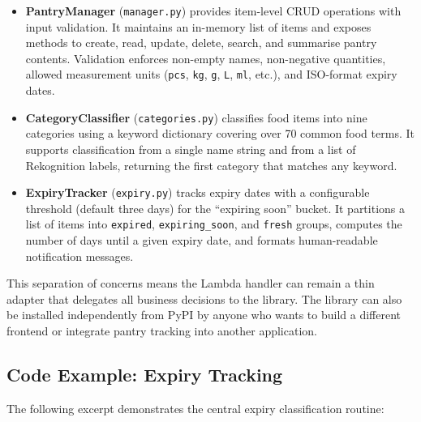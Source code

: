 \documentclass[conference]{IEEEtran}
\begin{document}
\begin{itemize}
    \item \textbf{PantryManager} (\texttt{manager.py}) provides item-level CRUD operations with input validation. It maintains an in-memory list of items and exposes methods to create, read, update, delete, search, and summarise pantry contents. Validation enforces non-empty names, non-negative quantities, allowed measurement units (\texttt{pcs}, \texttt{kg}, \texttt{g}, \texttt{L}, \texttt{ml}, etc.), and ISO-format expiry dates.
    \item \textbf{CategoryClassifier} (\texttt{categories.py}) classifies food items into nine categories using a keyword dictionary covering over 70 common food terms. It supports classification from a single name string and from a list of Rekognition labels, returning the first category that matches any keyword.
    \item \textbf{ExpiryTracker} (\texttt{expiry.py}) tracks expiry dates with a configurable threshold (default three days) for the ``expiring soon'' bucket. It partitions a list of items into \texttt{expired}, \texttt{expiring\_soon}, and \texttt{fresh} groups, computes the number of days until a given expiry date, and formats human-readable notification messages.
\end{itemize}

This separation of concerns means the Lambda handler can remain a thin adapter that delegates all business decisions to the library. The library can also be installed independently from PyPI by anyone who wants to build a different frontend or integrate pantry tracking into another application.

\subsection{Code Example: Expiry Tracking}

The following excerpt demonstrates the central expiry classification routine:
\end{document}
